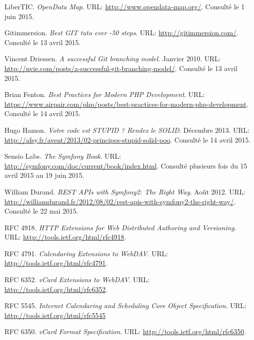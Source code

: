 
\renewcommand{\refname}{Webographie}

\begin{thebibliography}{ABC}

     LiberTIC. \emph{OpenData Map}. URL: \url{http://www.opendata-map.org/}. Consulté le 1 juin 2015.

     Gitimmersion. \emph{Best GIT tuto ever -50 steps}. URL: \url{http://gitimmersion.com/}. Consulté le 13 avril 2015.

     Vincent Driessen. \emph{A successful Git branching model}. Janvier 2010. URL: \url{http://nvie.com/posts/a-successful-git-branching-model/}. Consulté le 13 avril 2015.

     Brian Fenton. \emph{Best Practices for Modern PHP Development}. URL: \url{https://www.airpair.com/php/posts/best-practices-for-modern-php-development}. Consulté le 14 avril 2015.

     Hugo Hamon. \emph{Votre code est STUPID ? Rendez le SOLID}. Décembre 2013. URL: \url{http://afsy.fr/avent/2013/02-principes-stupid-solid-poo}. Consulté le 14 avril 2015.

     Sensio Labs. \emph{The Symfony Book}. URL: \url{http://symfony.com/doc/current/book/index.html}. Consulté plusieurs fois du 15 avril 2015 au 19 juin 2015.

     William Durand. \emph{REST APIs with Symfony2: The Right Way}. Août 2012. URL: \url{http://williamdurand.fr/2012/08/02/rest-apis-with-symfony2-the-right-way/}. Consulté le 22 mai 2015.

    \setcounter{firstbib}{\value{enumiv}}
\end{thebibliography}

\renewcommand{\refname}{RFCs}

\begin{thebibliography}{ABC}
    \setcounter{enumiv}{\value{firstbib}}

     RFC 4918. \emph{HTTP Extensions for Web Distributed Authoring and Versioning}. URL: \url{http://tools.ietf.org/html/rfc4918}.

     RFC 4791. \emph{Calendaring Extensions to WebDAV}. URL: \url{http://tools.ietf.org/html/rfc4791}.

     RFC 6352. \emph{vCard Extensions to WebDAV}. URL: \url{http://tools.ietf.org/html/rfc6352}.

     RFC 5545. \emph{Internet Calendaring and Scheduling Core Object Specification}. URL: \url{http://tools.ietf.org/html/rfc5545}

     RFC 6350. \emph{vCard Format Specification}. URL: \url{http://tools.ietf.org/html/rfc6350}.

\end{thebibliography}
